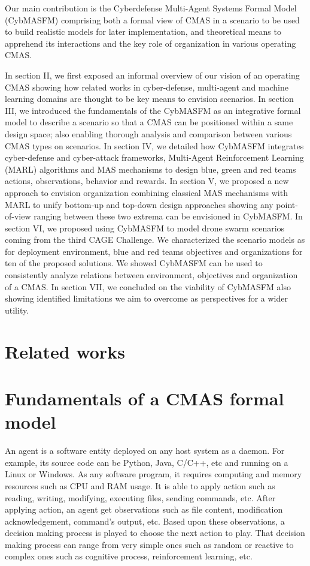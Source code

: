 \documentclass[conference]{IEEEtran}
\begin{document}
Our main contribution is the Cyberdefense Multi-Agent Systems Formal Model (CybMASFM) comprising both a formal view of CMAS in a scenario to be used to build realistic models for later implementation, and theoretical means to apprehend its interactions and the key role of organization in various operating CMAS.

In section II, we first exposed an informal overview of our vision of an operating CMAS showing how related works in cyber-defense, multi-agent and machine learning domains are thought to be key means to envision scenarios.
In section III, we introduced the fundamentals of the CybMASFM as an integrative formal model to describe a scenario so that a CMAS can be positioned within a same design space; also enabling thorough analysis and comparison between various CMAS types on scenarios.
In section IV, we detailed how CybMASFM integrates cyber-defense and cyber-attack frameworks, Multi-Agent Reinforcement Learning (MARL) algorithms and MAS mechanisms to design blue, green and red teams actions, observations, behavior and rewards.
In section V, we proposed a new approach to envision organization combining classical MAS mechanisms with MARL to unify bottom-up and top-down design approaches showing any point-of-view ranging between these two extrema can be envisioned in CybMASFM.
In section VI, we proposed using CybMASFM to model drone swarm scenarios coming from the third CAGE Challenge\cite{cage_challenge_3_announcement}. We characterized the scenario models as for deployment environment, blue and red teams objectives and organizations for ten of the proposed solutions. We showed CybMASFM can be used to consistently analyze relations between environment, objectives and organization of a CMAS.
In section VII, we concluded on the viability of CybMASFM also showing identified limitations we aim to overcome as perspectives for a wider utility.

\section{Related works}

\section{Fundamentals of a CMAS formal model}

An agent is a software entity deployed on any host system as a daemon.
For example, its source code can be Python, Java, C/C++, etc and running on a Linux or Windows.
As any software program, it requires computing and memory resources such as CPU and RAM usage.
It is able to apply action such as reading, writing, modifying, executing files, sending commands, etc.
After applying action, an agent get observations such as file content, modification acknowledgement, command's output, etc.
Based upon these observations, a decision making process is played to choose the next action to play. That decision making process can range from very simple ones such as random or reactive to complex ones such as cognitive process, reinforcement learning, etc.
\end{document}
